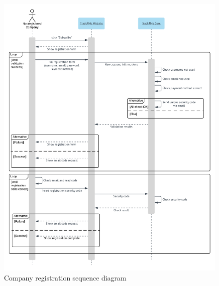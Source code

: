 \begin{figure}[H]
  \includegraphics[width=\textwidth,height=\textheight,keepaspectratio]{assets/sequence/CompanyRegistration.pdf}
  \caption{Company registration sequence diagram}
  \label{fig:CompanyRegistration}
\end{figure}











\newpage
